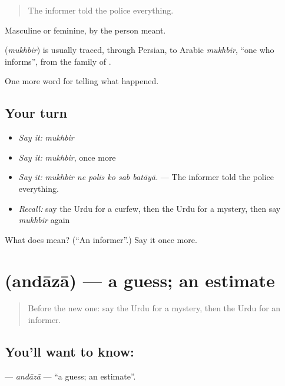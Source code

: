 \begin{quote}
The informer told the police everything.
\end{quote}

Masculine or feminine, by the person meant.

\begin{cousinweb}
\textbf{} (\emph{mukhbir}) is usually traced, through Persian, to Arabic \emph{mukhbir}, \textquotedblleft{}one who informs\textquotedblright{}, from the family of \textbf{}.
\end{cousinweb}

\begin{grammarlens}[title={What you've built}]
One more word for telling what happened.
\end{grammarlens}

\subsection*{Your turn}
\begin{itemize}
\raggedright
  \item \emph{Say it:} \emph{mukhbir}
  \item \emph{Say it:} \emph{mukhbir}, once more
  \item \emph{Say it:} \emph{mukhbir ne polīs ko sab batāyā.} — The informer told the police everything.
  \item \emph{Recall:} say the Urdu for a curfew, then the Urdu for a mystery, then say \emph{mukhbir} again
\end{itemize}

\begin{tcolorbox}[breakable,colback=teal!4,colframe=teal!35!black,title={Before you move on}]
What does  mean? (\textquotedblleft{}An informer\textquotedblright{}.) Say it once more.
\end{tcolorbox}
\section[\texorpdfstring{\ur{اندازہ} (andāzā)}{اندازہ (andāzā)}]{ (andāzā) — a guess; an estimate}

\label{lesson:UR-C305-andaza}



\begin{quote}
Before the new one: say the Urdu for a mystery, then the Urdu for an informer.
\end{quote}

\subsection*{You'll want to know: }
\textbf{} — \emph{andāzā} — \textquotedblleft{}a guess; an estimate\textquotedblright{}.

